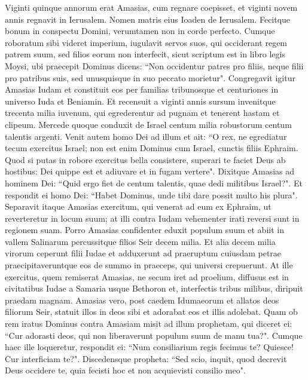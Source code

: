 \begin{biblechapter}  
\verse Viginti quinque annorum erat Amasias, cum regnare coepisset, et viginti novem annis regnavit in Ierusalem. Nomen matris eius Ioaden de Ierusalem. 
\verse Fecitque bonum in conspectu Domini, verumtamen non in corde perfecto. 
\verse Cumque roboratum sibi videret imperium, iugulavit servos suos, qui occiderant regem patrem suum, 
\verse sed filios eorum non interfecit, sicut scriptum est in libro legis Moysi, ubi praecepit Dominus dicens: “Non occidentur patres pro filiis, neque filii pro patribus suis, sed unusquisque in suo peccato morietur". 
\verse Congregavit igitur Amasias Iudam et constituit eos per familias tribunosque et centuriones in universo Iuda et Beniamin. Et recensuit a viginti annis sursum invenitque trecenta milia iuvenum, qui egrederentur ad pugnam et tenerent hastam et clipeum. 
\verse Mercede quoque conduxit de Israel centum milia robustorum centum talentis argenti. 
\verse Venit autem homo Dei ad illum et ait: “O rex, ne egrediatur tecum exercitus Israel; non est enim Dominus cum Israel, cunctis filiis Ephraim. 
\verse Quod si putas in robore exercitus bella consistere, superari te faciet Deus ab hostibus: Dei quippe est et adiuvare et in fugam vertere". 
\verse Dixitque Amasias ad hominem Dei: “Quid ergo fiet de centum talentis, quae dedi militibus Israel?". Et respondit ei homo Dei: “Habet Dominus, unde tibi dare possit multo his plura". 
\verse Separavit itaque Amasias exercitum, qui venerat ad eum ex Ephraim, ut reverteretur in locum suum; at illi contra Iudam vehementer irati reversi sunt in regionem suam. 
\verse Porro Amasias confidenter eduxit populum suum et abiit in vallem Salinarum percussitque filios Seir decem milia. 
\verse Et alia decem milia virorum ceperunt filii Iudae et adduxerunt ad praeruptum cuiusdam petrae praecipitaveruntque eos de summo in praeceps, qui universi crepuerunt. 
\verse At ille exercitus, quem remiserat Amasias, ne secum iret ad proelium, diffusus est in civitatibus Iudae a Samaria usque Bethoron et, interfectis tribus milibus, diripuit praedam magnam. 
\verse Amasias vero, post caedem Idumaeorum et allatos deos filiorum Seir, statuit illos in deos sibi et adorabat eos et illis adolebat. 
\verse Quam ob rem iratus Dominus contra Amasiam misit ad illum prophetam, qui diceret ei: “Cur adorasti deos, qui non liberaverunt populum suum de manu tua?". 
\verse Cumque haec ille loqueretur, respondit ei: “Num consiliarium regis fecimus te? Quiesce! Cur interficiam te?". Discedensque propheta: “Sed scio, inquit, quod decrevit Deus occidere te, quia fecisti hoc et non acquievisti consilio meo". 

\end{biblechapter}
